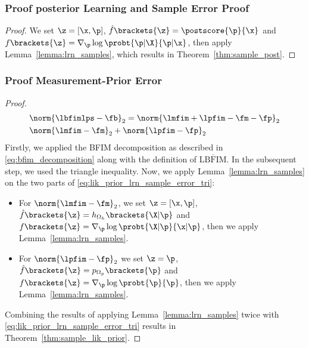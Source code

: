 \subsubsection{Proof posterior Learning and Sample Error Proof}\label{proof:post:lrn_sample}
\begin{proof}
    We set $\z=[\x,\p]$, $\hat{f}\brackets{\z}=\postscore{\p}{\x}$ and $f\brackets{\z}=\nabla_{\p}\log\probt{\p|\X}{\p|\x}$, then apply Lemma~\ref{lemma:lrn_samples}, which results in Theorem~\ref{thm:sample_post}.
\end{proof}
\subsubsection{Proof Measurement-Prior Error}\label{proof:lik_prior:lrn_samples}
\begin{proof}
    \begin{align}\label{eq:lik_prior_lrn_sample_error_tri}
        &\norm{\lbfimlps-\fb}_2=\norm{\lmfim+\lpfim-\fm-\fp}_2\nonumber\\
        &\norm{\lmfim-\fm}_2+\norm{\lpfim-\fp}_2
    \end{align}
    Firstly, we applied the BFIM decomposition as described in \eqref{eq:bfim_decomposition} along with the definition of $\overline{\mathrm{LBFIM}}$. In the subsequent step, we used the triangle inequality.
    Now, we apply Lemma~\ref{lemma:lrn_samples} on the two parts of \eqref{eq:lik_prior_lrn_sample_error_tri}:
    \begin{itemize}
        \item For $\norm{\lmfim-\fm}_2$, we set $\z=[\x,\p]$, $\hat{f}\brackets{\z}=h_{\Omega_{h}}\brackets{\X|\p}$ and $f\brackets{\z}=\nabla_{\p}\log\probt{\X|\p}{\x|\p}$, then we apply Lemma~\ref{lemma:lrn_samples}.
        \item For $\norm{\lpfim-\fp}_2$    we set $\z=\p$, $\hat{f}\brackets{\z}=p_{\Omega_p}\brackets{\p}$ and $f\brackets{\z}=\nabla_{\p}\log\probt{\p}{\p}$, then we apply Lemma~\ref{lemma:lrn_samples}.
    \end{itemize}
    Combining the results of applying Lemma~\ref{lemma:lrn_samples} twice with \eqref{eq:lik_prior_lrn_sample_error_tri} results in Theorem~\ref{thm:sample_lik_prior}.
\end{proof}